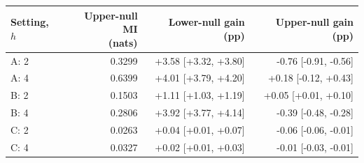 \begin{tabular}{@{}lrrr@{}}
\toprule
Setting, \(h\) & \shortstack{Upper-null MI\\(nats)} & Lower-null gain (pp) & Upper-null gain (pp)\\
\midrule
A: 2 & 0.3299 & +3.58 [+3.32, +3.80] & -0.76 [-0.91, -0.56]\\
A: 4 & 0.6399 & +4.01 [+3.79, +4.20] & +0.18 [-0.12, +0.43]\\
B: 2 & 0.1503 & +1.11 [+1.03, +1.19] & +0.05 [+0.01, +0.10]\\
B: 4 & 0.2806 & +3.92 [+3.77, +4.14] & -0.39 [-0.48, -0.28]\\
C: 2 & 0.0263 & +0.04 [+0.01, +0.07] & -0.06 [-0.06, -0.01]\\
C: 4 & 0.0327 & +0.02 [+0.01, +0.03] & -0.01 [-0.03, -0.01]\\
\bottomrule
\end{tabular}
